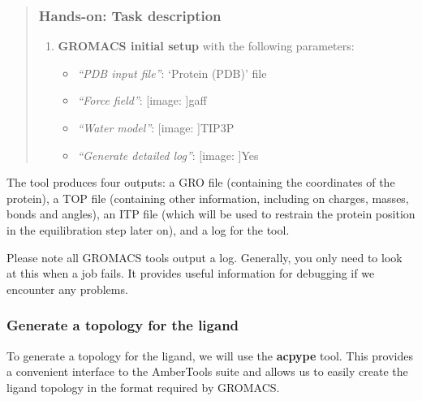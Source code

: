 \documentclass[twocolumn]{bmcart}%
\def\texttt{[image: ]}
\providecommand{\tightlist}{%
  \setlength{\itemsep}{0pt}\setlength{\parskip}{0pt}}
\begin{document}
\begin{quote}
\hypertarget{hands-on-task-description-1}{%
\subsubsection{Hands-on: Task
description}\label{hands-on-task-description-1}}

\begin{enumerate}
\def\labelenumi{\arabic{enumi}.}
\tightlist
\item
  \textbf{GROMACS initial setup} with the following parameters:

  \begin{itemize}
  \tightlist
  \item
    \emph{``PDB input file''}: `Protein (PDB)' file
  \item
    \emph{``Force field''}: \texttt{gaff}
  \item
    \emph{``Water model''}: \texttt{TIP3P}
  \item
    \emph{``Generate detailed log''}: \texttt{Yes}
  \end{itemize}
\end{enumerate}


\end{quote}

The tool produces four outputs: a GRO file (containing the coordinates
of the protein), a TOP file (containing other information, including on
charges, masses, bonds and angles), an ITP file (which will be used to
restrain the protein position in the equilibration step later on), and a
log for the tool.

Please note all GROMACS tools output a log. Generally, you only need to
look at this when a job fails. It provides useful information for
debugging if we encounter any problems.

\hypertarget{generate-a-topology-for-the-ligand}{%
\subsubsection{Generate a topology for the
ligand}\label{generate-a-topology-for-the-ligand}}

To generate a topology for the ligand, we will use the \textbf{acpype}
tool. This provides a convenient interface to the AmberTools suite and
allows us to easily create the ligand topology in the format required by
GROMACS.
\end{document}
